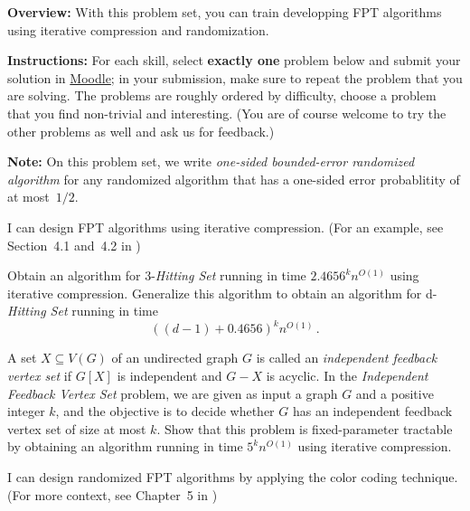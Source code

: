 \documentclass[english]{uebung_cs}
\begin{document}
\textbf{Overview:} With this problem set, you can train developping FPT algorithms using iterative compression and randomization.

\textbf{Instructions:} For each skill, select \textbf{exactly one} problem below and submit your solution in \href{https://moodle.studiumdigitale.uni-frankfurt.de/moodle/course/view.php?id=6259}{Moodle}; in your submission, make sure to repeat the problem that you are solving.
The problems are roughly ordered by difficulty, choose a problem that you find non-trivial and interesting. (You are of course welcome to try the other problems as well and ask us for feedback.)

\textbf{Note:} On this problem set, we write \emph{one-sided bounded-error randomized algorithm} for any randomized algorithm that has a one-sided error probablitity of at most~$1/2$.

\begin{skill}
  I can design FPT algorithms using iterative compression. \normalfont (For an example, see Section~4.1 and~4.2 in \cygan{})
\end{skill}

\begin{exercise}
  Obtain an algorithm for 3-\emph{Hitting Set} running in time $2.4656^kn^{O(1)}$ using iterative compression. Generalize this algorithm to obtain an algorithm for d-\emph{Hitting Set} running in time \[((d-1)+0.4656)^kn^{O(1)} \,. \]
\end{exercise}

\begin{exercise}
  A set $X \subseteq V(G)$ of an undirected graph $G$ is called an \emph{independent feedback vertex set} if $G[X]$ is independent and $G - X$ is acyclic. In the \emph{Independent Feedback Vertex Set} problem, we are given as input a graph $G$ and a positive integer $k$, and the objective is to decide whether $G$ has an independent feedback vertex set of size at most $k$. Show that this problem is fixed-parameter tractable by obtaining an algorithm running in time $5^kn^{O(1)}$ using iterative compression.
\end{exercise}

\begin{skill}
  I can design randomized FPT algorithms by applying the color coding technique. \normalfont (For more context, see Chapter~5 in \cygan{})
\end{skill}
\end{document}

